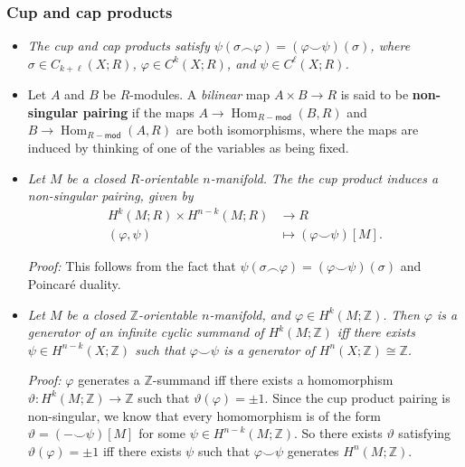 \documentclass[10pt]{article}
\newcommand{\zz}{\mathbb{Z}}
\DeclareMathOperator{\Hom}{Hom}
\begin{document}
            \subsubsection{Cup and cap products}

                \begin{itemize}
                    \item \emph{The cup and cap products satisfy $\psi(\sigma\smallfrown\varphi)=(\varphi\smallsmile\psi)(\sigma)$, where $\sigma\in C_{k+\ell}(X;R)$, $\varphi\in C^k(X;R)$, and $\psi\in C^\ell(X;R)$.}
                    \item Let $A$ and $B$ be $R$-modules.
                        A \emph{bilinear} map $A\times B\to R$ is said to be \textbf{non-singular pairing} if the maps $A\to\Hom_{R-\mathsf{mod}}(B,R)$ and $B\to\Hom_{R-\mathsf{mod}}(A,R)$ are both isomorphisms, where the maps are induced by thinking of one of the variables as being fixed.
                    \item \emph{Let $M$ be a closed $R$-orientable $n$-manifold.}
                        \emph{The the cup product induces a non-singular pairing, given by}
                        \begin{align*}
                            H^k(M;R)\times H^{n-k}(M;R)&\to R\\
                            (\varphi,\psi)&\mapsto(\varphi\smallsmile\psi)[M].
                        \end{align*}

                        \emph{Proof:} This follows from the fact that $\psi(\sigma\smallfrown\varphi)=(\varphi\smallsmile\psi)(\sigma)$ and Poincaré duality.

                    \item \emph{Let $M$ be a closed $\zz$-orientable $n$-manifold, and $\varphi\in H^k(M;\zz)$.}
                        \emph{Then $\varphi$ is a generator of an infinite cyclic summand of $H^k(M;\zz)$ iff there exists $\psi\in H^{n-k}(X;\zz)$ such that $\varphi\smallsmile\psi$ is a generator of $H^n(X;\zz)\cong\zz$.}

                        \emph{Proof:} $\varphi$ generates a $\zz$-summand iff there exists a homomorphism $\vartheta\colon H^k(M;\zz)\to\zz$ such that $\vartheta(\varphi)=\pm1$.
                            Since the cup product pairing is non-singular, we know that every homomorphism is of the form $\vartheta=(-\smallsmile\psi)[M]$ for some $\psi\in H^{n-k}(M;\zz)$.
                            So there exists $\vartheta$ satisfying $\vartheta(\varphi)=\pm1$ iff there exists $\psi$ such that $\varphi\smallsmile\psi$ generates $H^n(M;\zz)$.
                \end{itemize}
\end{document}
